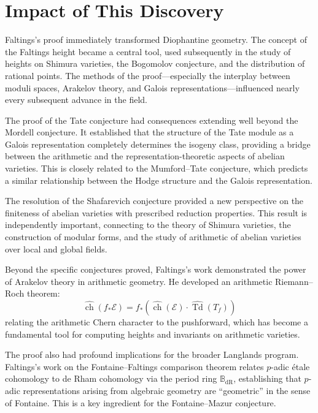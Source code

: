\section{Impact of This Discovery}

Faltings's proof immediately transformed Diophantine geometry. The concept of the Faltings height became a central tool, used subsequently in the study of heights on Shimura varieties, the Bogomolov conjecture, and the distribution of rational points. The methods of the proof---especially the interplay between moduli spaces, Arakelov theory, and Galois representations---influenced nearly every subsequent advance in the field.

The proof of the Tate conjecture had consequences extending well beyond the Mordell conjecture. It established that the structure of the Tate module as a Galois representation completely determines the isogeny class, providing a bridge between the arithmetic and the representation-theoretic aspects of abelian varieties. This is closely related to the Mumford--Tate conjecture, which predicts a similar relationship between the Hodge structure and the Galois representation.

The resolution of the Shafarevich conjecture provided a new perspective on the finiteness of abelian varieties with prescribed reduction properties. This result is independently important, connecting to the theory of Shimura varieties, the construction of modular forms, and the study of arithmetic of abelian varieties over local and global fields.

Beyond the specific conjectures proved, Faltings's work \cite{faltings1983} demonstrated the power of Arakelov theory in arithmetic geometry. He developed an arithmetic Riemann--Roch theorem:
\[
\widehat{\operatorname{ch}}(f_* \mathcal{E}) = f_*(\widehat{\operatorname{ch}}(\mathcal{E}) \cdot \widehat{\operatorname{Td}}(T_f))
\]
relating the arithmetic Chern character to the pushforward, which has become a fundamental tool for computing heights and invariants on arithmetic varieties.

The proof also had profound implications for the broader Langlands program. Faltings's work \cite{faltings1983} on the Fontaine--Faltings comparison theorem relates $p$-adic \'etale cohomology to de Rham cohomology via the period ring $\mathbb{B}_{\mathrm{dR}}$, establishing that $p$-adic representations arising from algebraic geometry are ``geometric'' in the sense of Fontaine. This is a key ingredient for the Fontaine--Mazur conjecture.

